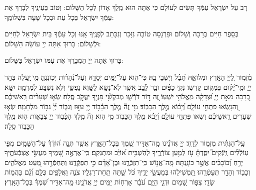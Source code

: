 \documentclass[twoside, openany, parskip=half, 11pt]{book}
\begin{document}
\weekdaysashemakoleinu

\retzeh

\yaalehveyavo

\zion

\maarivmodim

\alhanisim

\weekdaysahodos



 רָב עַל יִשְׂרָאֵל עַמְּֿךָ תָּשִׂים לְעוֹלָם כִּי אַתָּה הוּא מֶֽלֶךְ אָדוֹן לְכָל הַשָּׁלוֹם:
 וְטוֹב בְּעֵינֶֽיךָ לְבָרֵךְ אֶת עַמְּֿךָ יִשְׂרָאֵל בְּכָל עֵת וּבְכָל שָׁעָה בִּשְׁלוֹמֶֽךָ:
\begin{paracol}{2}

\begin{small}
 בְּסֵֽפֶר חַיִּים בְּרָכָה וְשָׁלוֹם וּפַרְנָסָה טוֹבָה נִזָּכֵר וְנִכָּתֵב לְפָנֶֽיךָ אָֽנוּ וְכָל עַמְּֿךָ בֵּית יִשְׂרָאֵל לְחַיִּים וּלְשָׁלוֹם: בָּרוּךְ אַתָּה יְיָ עוֹשֵׂה הַשָּׁלוֹם:
\end{small}
\switchcolumn
בָּרוּךְ אַתָּה יְיָ הַמְֿבָרֵךְ אֶת עַמּוֹ יִשְׂרָאֵל בַּשָּׁלוֹם:
\end{paracol}

\tachanunim

\vfill

 \pageref{matzash_alienu}

\clearpage


  
  מִ֫זְמ֥וֹר
לַ֭יְיָ הָאָ֣רֶץ וּמְלוֹאָ֑הּ תֵּ֝בֵ֗ל וְי֣שְֿׁבֵי בָֽהּ׃ 
כִּי־ה֖וּא עַל־יַמִּ֣ים יְסָדָ֑הּ וְעַל־נְ֝הָר֗וֹת יְכֽוֹנֲנֶֽהָ׃ 
מִ֥י ֖יַֽעֲלֶה בְּהַ֣ר יְיָ֑ וּמִ֥י־יָ֝ק֗וּם בִּמְק֥וֹם קָדְשֽׁוֹ׃
נְקִ֥י כַפַּ֗יִם וּבַ֢ר לֵ֫בָ֥ב אֲשֶׁ֤ר לֹֽא־נָשָׂ֣א לַשָּׁ֣וְא נַפְשִׁ֑י וְלֹ֖א נִשְׁבַּ֣ע לְמִרְמָֽה׃ 
יִשָּׂ֣א בְ֭רָכָה מֵאֵ֣ת יְיָ֑ וּ֝צְדָקָ֗ה מֵֽאֱלֹהֵ֥י יִשְׁעֽוֹ׃ 
זֶ֭ה דּ֣וֹר דֹּרְֿשָׁ֑ו מְבַקְשֵׁ֥֨י פָנֶי֖ךָ יַֽעֲקֹ֣ב סֶֽלָה׃ 
שְׂא֤וּ שְׁעָרִ֨ים רָֽאשֵׁיכֶ֗ם וְ֭הִנָּֽשְׂאוּ פִּתְחֵ֣י עוֹלָ֑ם וְ֝יָב֗וֹא מֶ֣לֶךְ הַכָּבֽוֹד׃ 
מִ֥י זֶה֘ מֶ֤לֶךְ הַכָּ֫ב֥וֹד יְ֖יָ עִזּ֣וּז וְגִבּ֑וֹר יְ֜יָ֗ גִּבּ֥וֹר מִלְחָמָֽה׃ 
שְׂא֤וּ שְׁעָרִים רָֽאשֵׁיכֶ֗ם וּ֭שְׂאוּ פִּתְחֵ֣י עוֹלָ֑ם וְ֝יָבֹ֗א מֶ֣לֶךְ הַכָּבֽוֹד׃ 
מִ֤י ה֣וּא זֶה֘ מֶ֢לֶךְ הַכָּ֫ב֥וֹד יְיָ֥ צְבָא֑וֹת ה֤וּא מֶ֖לֶךְ הַכָּב֣וֹד סֶֽלָה׃


 
 עַֽל־הַגִּתִּ֗ית מִזְמ֥וֹר לְדָוִֽד׃
 יְיָ֤ אֲדֹנֵ֗ינוּ מָֽה־אַדִּ֣יר שִׁ֭מְךָ בְּכָל־הָאָ֑רֶץ אֲשֶׁ֥ר תְּנָ֥ה ה֝וֹדְֿךָ֗ עַל־הַשָּׁמָֽיִם׃
  מִפִּ֤י עֽוֹלְֿלִ֨ים וְֽיֹנְֿקִים֮ יִסַּ֪דְתָּ֫ עֹ֥ז לְמַ֥עַן צוֹרְֿרֶ֑יךָ לְהַשְׁבִּ֥ית א֝וֹיֵ֗ב וּמִתְנַקֵּֽם׃
   כִּֽי־אֶרְאֶ֣ה שָׁ֭מֶיךָ מַעֲשֵׂ֣י אֶצְבְּֿעֹתֶ֑יךָ יָרֵ֥חַ וְ֝כוֹכָבִ֗ים אֲשֶׁ֣ר כּוֹנָֽנְתָּה׃
    מָֽה־אֱנ֥וֹשׁ כִּֽי־תִזְכְּֿרֶ֑נּוּ וּבֶן־אָ֝דָ֗ם כִּ֣י תִפְקְֿדֶֽנּוּ׃
     וַתְּחַסְּֿרֵ֣הוּ מְּ֭עַט מֵאֱלֹהִ֑ים וְכָב֖וֹד וְהָדָ֣ר תְּעַטְּֿרֵֽהוּ׃
      תַּ֭מְשִׁילֵהוּ בְּמַעֲשֵׂ֣י יָדֶ֑יךָ כֹּ֝ל שַׁ֣תָּה תַֽחַת־רַגְלָֽיו׃
       צֹנֶ֣ה וַאֲלָפִ֣ים כֻּלָּ֑ם וְ֝גַ֗ם בַּהֲמ֥וֹת שָׂדָֽי׃
        צִפּ֣וֹר שָׁ֭מַיִם וּדְגֵ֣י הַיָּ֑ם עֹ֝בֵ֗ר אָרְח֥וֹת יַמִּֽים׃
         יְיָ֥ אֲדֹנֵ֑ינוּ מָֽה־אַדִּ֥יר שִׁ֝מְךָ֗ בְּכָל־הָאָֽרֶץ׃
\end{document}

